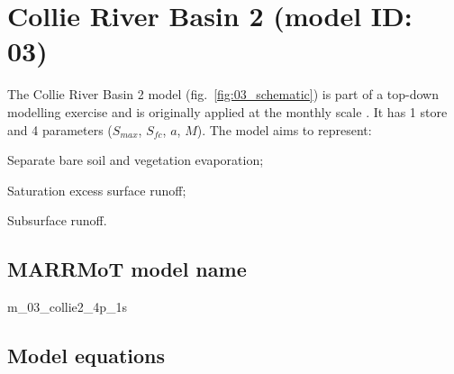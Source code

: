 \section{Collie River Basin 2 (model ID: 03)}
The Collie River Basin 2 model (fig.~\ref{fig:03_schematic}) is part of a top-down modelling exercise and is originally applied at the monthly scale \citep{Jothityangkoon2001}. It has 1 store and 4 parameters ($S_{max}$, $S_{fc}$, $a$, $M$). The model aims to represent:

\begin{itemizecompact}
\item Separate bare soil and vegetation evaporation;
\item Saturation excess surface runoff;
\item Subsurface runoff.
\end{itemizecompact}

\subsection{MARRMoT model name}
m\_03\_collie2\_4p\_1s \\

\subsection{Model equations}

